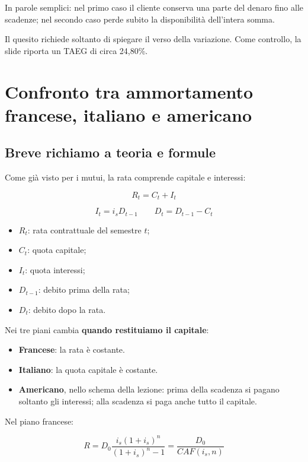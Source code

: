\noindent In parole semplici:
nel primo caso il cliente conserva
una parte del denaro fino alle scadenze;
nel secondo caso perde subito
la disponibilità dell'intera somma.

\noindent Il quesito richiede soltanto
di spiegare il verso della variazione.
Come controllo, la slide riporta
un TAEG di circa 24,80\%.


\section{Confronto tra ammortamento francese,
italiano e americano}

\subsection*{Breve richiamo a teoria e formule}

\noindent Come già visto per i mutui,
la rata comprende capitale e interessi:

\[
\boxed{R_t=C_t+I_t}
\]

\[
\boxed{I_t=i_sD_{t-1}}
\qquad
\boxed{D_t=D_{t-1}-C_t}
\]

\begin{itemize}
    \item $R_t$: rata contrattuale del semestre $t$;
    \item $C_t$: quota capitale;
    \item $I_t$: quota interessi;
    \item $D_{t-1}$: debito prima della rata;
    \item $D_t$: debito dopo la rata.
\end{itemize}

\noindent Nei tre piani cambia
\textbf{quando restituiamo il capitale}:

\begin{itemize}
    \item \textbf{Francese}: la rata è costante.

    \item \textbf{Italiano}: la quota capitale è costante.

    \item \textbf{Americano}, nello schema della lezione:
    prima della scadenza si pagano soltanto gli interessi;
    alla scadenza si paga anche tutto il capitale.
\end{itemize}

\noindent Nel piano francese:

\[
\boxed{
R
=
D_0\frac{i_s(1+i_s)^n}{(1+i_s)^n-1}
=
\frac{D_0}{CAF(i_s,n)}
}
\]

